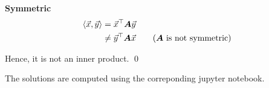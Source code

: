 \solution

\textbf{Symmetric}
\begin{align*}
	\innerprod \vecx \vecy &= \vecx^\top \mata \vecy \\
	&\neq \vecy^\top \mata \vecx \tag{$\mata$ is not symmetric}
\end{align*}

Hence, it is not an inner product. \qed

The solutions are computed using the correponding jupyter notebook.




















































